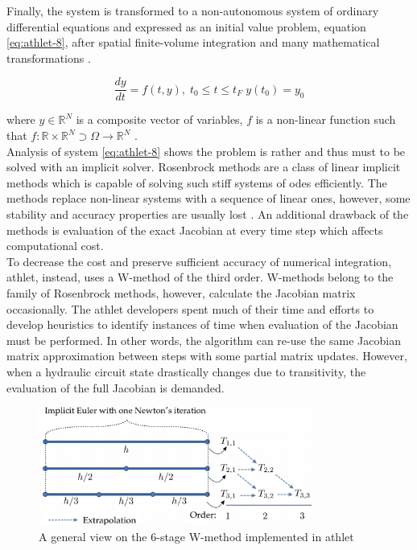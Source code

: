 Finally, the system is transformed to a non-autonomous system of ordinary differential equations and expressed as an initial value problem, equation \ref{eq:athlet-8}, after spatial finite-volume integration and many mathematical transformations \cite{lt:ATHLMaM}. 


\begin{equation} \label{eq:athlet-8}
	\frac{dy}{dt} = f(t,y), \;  t_{0} \leq t \leq t_{F} \; y(t_{0}) = y_{0}
\end{equation}

where $y \in \mathbb{R}^{N}$ is a composite vector of variables, $f$ is a non-linear function such that $f : \mathbb{R} \times \mathbb{R}^{N} \supset \Omega  \rightarrow \mathbb{R}^{N}$  .\\


Analysis of system \ref{eq:athlet-8} shows the problem is rather and thus must to be solved with an implicit solver. Rosenbrock methods are a class of linear implicit methods which is capable of solving such stiff systems of \gls{ode}s efficiently. The methods replace non-linear systems with a sequence of linear ones, however, some stability and accuracy properties are usually lost \cite{blom2013rosenbrock}. An additional drawback of the methods is evaluation of the exact Jacobian at every time step which affects computational cost.\\


To decrease the cost and preserve sufficient accuracy of numerical integration, \gls{athlet}, instead, uses a W-method of the third order. W-methods belong to the family of Rosenbrock methods, however, calculate the Jacobian matrix occasionally. The \gls{athlet} developers spent much of their time and efforts to develop heuristics to identify instances of time when evaluation of the Jacobian must be performed. In other words, the algorithm can re-use the same Jacobian matrix approximation between steps with some partial matrix updates. However, when a hydraulic circuit state drastically changes due to transitivity, the evaluation of the full Jacobian is demanded.\\


\figpointer{\ref{fig:introduction-w-method-scheme}}
\begin{figure}[htpb]
  \centering
  \includegraphics[width=0.8\textwidth]{figures/introduction-rosenbrock-scheme.png}
\caption{A general view on the 6-stage W-method implemented in \gls{athlet}}
\label{fig:introduction-w-method-scheme}
\end{figure}


